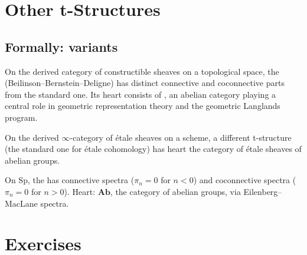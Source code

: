 \section{Other t-Structures}
\label{sec:other-t}

\subsection{Formally: variants}

\begin{example_thm}
\label{ex:perverse}
On the derived category of constructible sheaves on a topological space,
the  (Beilinson–Bernstein–Deligne) has
distinct connective and coconnective parts from the standard one. Its
heart consists of , an abelian category
playing a central role in geometric representation theory and the
geometric Langlands program.
\end{example_thm}

\begin{example_thm}
\label{ex:etale}
On the derived $\infty$-category of étale sheaves on a scheme, a different
t-structure (the standard one for étale cohomology) has heart the
category of étale sheaves of abelian groups.
\end{example_thm}

\begin{example_thm}
\label{ex:postnikov-spectra}
On $\mathrm{Sp}$, the  has connective spectra
($\pi_n = 0$ for $n < 0$) and coconnective spectra ($\pi_n = 0$ for $n > 0$).
Heart: $\mathbf{Ab}$, the category of abelian groups, via Eilenberg–MacLane
spectra.
\end{example_thm}


\section{Exercises}
\label{sec:triangulated-exercises}

